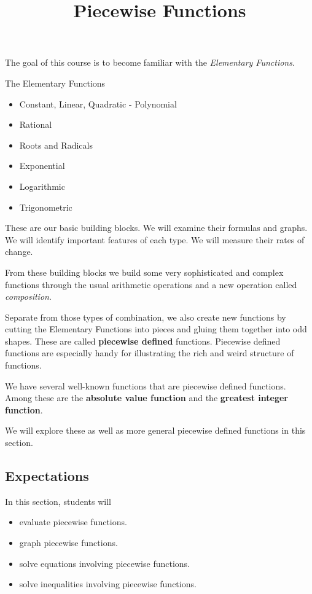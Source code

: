 \documentclass{ximera}
\title{Piecewise Functions}
\begin{document}
\begin{abstract}
\end{abstract}
\maketitle



The goal of this course is to become familiar with the \textit{Elementary Functions}. 


\begin{summary} The Elementary Functions
	\begin{itemize}
		\item Constant, Linear, Quadratic - Polynomial
		\item Rational
		\item Roots and Radicals
		\item Exponential
		\item Logarithmic
		\item Trigonometric
	\end{itemize}
\end{summary}




These are our basic building blocks.  We will examine their formulas and graphs.  We will identify important features of each type. We will measure their rates of change. 

From these building blocks we build some very sophisticated and complex functions through the usual arithmetic operations and a new operation called \textit{composition}. 

Separate from those types of combination, we also create new functions by cutting the Elementary Functions into pieces and gluing them together into odd shapes.   These are called \textbf{piecewise defined} functions.  Piecewise defined functions are especially handy for illustrating the rich and weird structure of functions.


We have several well-known functions that are piecewise defined functions. Among these are the \textbf{absolute value function} and the \textbf{greatest integer function}.

We will explore these as well as more general piecewise defined functions in this section. \\






\subsection{Expectations}



\begin{sectionOutcomes}
In this section, students will 

\begin{itemize}
\item evaluate piecewise functions.
\item graph piecewise functions.
\item solve equations involving piecewise functions.
\item solve inequalities involving piecewise functions.
\end{itemize}
\end{sectionOutcomes}
\end{document}
